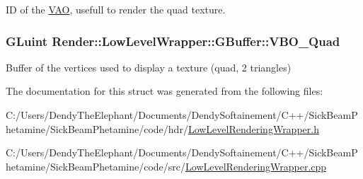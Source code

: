 ID of the \hyperlink{struct_render_1_1_low_level_wrapper_1_1_v_a_o}{V\+AO}, usefull to render the quad texture. 

\subsubsection[{\texorpdfstring{V\+B\+O\+\_\+\+Quad}{VBO_Quad}}]{\setlength{\rightskip}{0pt plus 5cm}G\+Luint Render\+::\+Low\+Level\+Wrapper\+::\+G\+Buffer\+::\+V\+B\+O\+\_\+\+Quad}\hypertarget{struct_render_1_1_low_level_wrapper_1_1_g_buffer_afd4d0ed8061d9c841219e0109ffa6d13}{}\label{struct_render_1_1_low_level_wrapper_1_1_g_buffer_afd4d0ed8061d9c841219e0109ffa6d13}


Buffer of the vertices used to display a texture (quad, 2 triangles) 



The documentation for this struct was generated from the following files\+:\begin{DoxyCompactItemize}
\item 
C\+:/\+Users/\+Dendy\+The\+Elephant/\+Documents/\+Dendy\+Softainement/\+C++/\+Sick\+Beam\+Phetamine/\+Sick\+Beam\+Phetamine/code/hdr/\hyperlink{_low_level_rendering_wrapper_8h}{Low\+Level\+Rendering\+Wrapper.\+h}\item 
C\+:/\+Users/\+Dendy\+The\+Elephant/\+Documents/\+Dendy\+Softainement/\+C++/\+Sick\+Beam\+Phetamine/\+Sick\+Beam\+Phetamine/code/src/\hyperlink{_low_level_rendering_wrapper_8cpp}{Low\+Level\+Rendering\+Wrapper.\+cpp}\end{DoxyCompactItemize}
